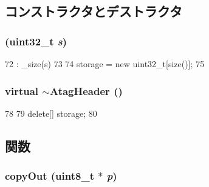 \subsection{コンストラクタとデストラクタ}
\hypertarget{classAtagHeader_a156b78cd4f417d8c5d8f86931e29cdc1}{
\subsubsection[{AtagHeader}]{ ({\bf uint32\_\-t} {\em s})}}
\label{classAtagHeader_a156b78cd4f417d8c5d8f86931e29cdc1}



\begin{DoxyCode}
72         : _size(s)
73     {
74         storage = new uint32_t[size()];
75     }
\end{DoxyCode}
\hypertarget{classAtagHeader_ada4038ad574b03e7c1616d1b36374be4}{
\subsubsection[{$\sim$AtagHeader}]{\setlength{\rightskip}{0pt plus 5cm}virtual $\sim${\bf AtagHeader} ()}}
\label{classAtagHeader_ada4038ad574b03e7c1616d1b36374be4}



\begin{DoxyCode}
78     {
79         delete[] storage;
80     }
\end{DoxyCode}


\subsection{関数}
\hypertarget{classAtagHeader_a685d2cec993b872c6370a1ee5c101dd0}{
\subsubsection[{copyOut}]{ copyOut (uint8\_\-t $\ast$ {\em p})}}
\label{classAtagHeader_a685d2cec993b872c6370a1ee5c101dd0}



